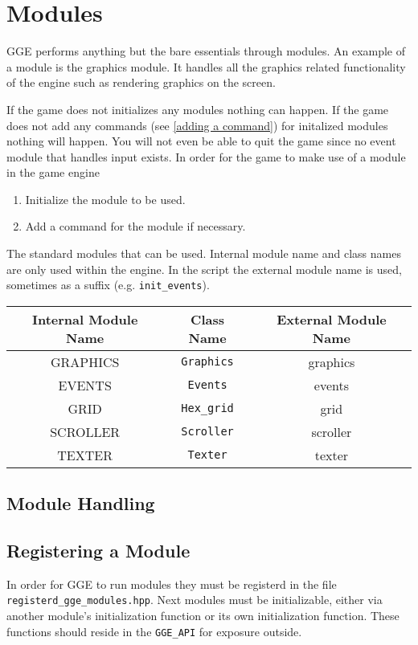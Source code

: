 \documentclass{article}
\begin{document}
\section{Modules}
GGE performs anything but the bare essentials through modules. An example of a module is the graphics module. It handles all the graphics related functionality of the engine such as rendering graphics on the screen.

If the game does not initializes any modules nothing can happen. 
If the game does not add any commands (see \ref{adding a command}) for initalized modules nothing will happen.
You will not even be able to quit the game since no event module that handles input exists.
In order for the game to make use of a module in the game engine
\begin{enumerate}
	\item Initialize the module to be used.
	\item Add a command for the module if necessary.
\end{enumerate}

The standard modules that can be used. Internal module name and class names are only used within the engine. 
In the script the external module name is used, sometimes as a suffix (e.g. \verb|init_events|).

\begin{tabular}{|c|c||c|}
	Internal Module Name & Class Name & External Module Name \\
	\hline
	GRAPHICS & \verb|Graphics| & graphics \\
	EVENTS & \verb|Events| & events \\
	GRID & \verb|Hex_grid| & grid \\
	SCROLLER & \verb|Scroller| & scroller \\
	TEXTER & \verb|Texter| & texter \\
\end{tabular}

\subsection{Module Handling}


\subsection{Registering a Module}
In order for GGE to run modules they must be registerd in the file \verb|registerd_gge_modules.hpp|.
Next modules must be initializable, either via another module's initialization function or its own initialization
function. These functions should reside in the \verb|GGE_API| for exposure outside.
\end{document}
